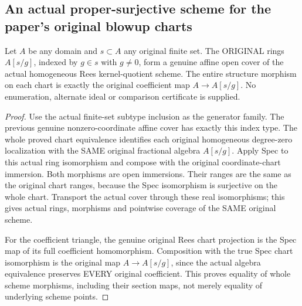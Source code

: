 \subsection{An actual proper-surjective scheme for the paper's original blowup charts}
\begin{theorem}
\label{scheme:paper-rees-original-chart-cover}
\leanok
{}
Let $A$ be any domain and $s\subset A$ any original finite set. The ORIGINAL
rings $A[s/g]$, indexed by $g\in s$ with $g\ne0$, form a genuine affine open
cover of the actual homogeneous Rees kernel-quotient scheme. The entire
structure morphism on each chart is exactly the original coefficient map
$A\to A[s/g]$. No enumeration, alternate ideal or comparison certificate is
supplied.
\end{theorem}
\begin{proof}
Use the actual finite-set subtype inclusion as the generator family. The
previous genuine nonzero-coordinate affine cover has exactly this index
type. The whole proved chart equivalence identifies each original homogeneous
degree-zero localization with the SAME original fractional algebra $A[s/g]$.
Apply Spec to this actual ring isomorphism and compose with the original
coordinate-chart immersion. Both morphisms are open immersions. Their ranges
are the same as the original chart ranges, because the Spec isomorphism is
surjective on the whole chart. Transport the actual cover through these real
isomorphisms; this gives actual rings, morphisms and pointwise coverage of the
SAME original scheme.

For the coefficient triangle, the genuine original Rees chart projection is
the Spec map of its full coefficient homomorphism. Composition with the true
Spec chart isomorphism is the original map $A\to A[s/g]$, since the actual
algebra equivalence preserves EVERY original coefficient. This proves equality
of whole scheme morphisms, including their section maps, not merely equality
of underlying scheme points.
\end{proof}

